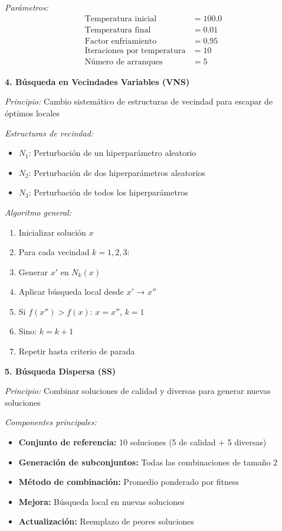 \textit{Parámetros:}
\begin{align}
\text{Temperatura inicial} &= 100.0 \\
\text{Temperatura final} &= 0.01 \\
\text{Factor enfriamiento} &= 0.95 \\
\text{Iteraciones por temperatura} &= 10 \\
\text{Número de arranques} &= 5
\end{align}

\textbf{4. Búsqueda en Vecindades Variables (VNS)}

\textit{Principio:} Cambio sistemático de estructuras de vecindad para escapar de óptimos locales

\textit{Estructuras de vecindad:}
\begin{itemize}
    \item $N_1$: Perturbación de un hiperparámetro aleatorio
    \item $N_2$: Perturbación de dos hiperparámetros aleatorios
    \item $N_3$: Perturbación de todos los hiperparámetros
\end{itemize}

\textit{Algoritmo general:}
\begin{enumerate}
    \item Inicializar solución $x$
    \item Para cada vecindad $k = 1, 2, 3$:
    \item \quad Generar $x'$ en $N_k(x)$
    \item \quad Aplicar búsqueda local desde $x'$ → $x''$
    \item \quad Si $f(x'') > f(x)$: $x = x''$, $k = 1$
    \item \quad Sino: $k = k + 1$
    \item Repetir hasta criterio de parada
\end{enumerate}

\textbf{5. Búsqueda Dispersa (SS)}

\textit{Principio:} Combinar soluciones de calidad y diversas para generar nuevas soluciones

\textit{Componentes principales:}
\begin{itemize}
    \item \textbf{Conjunto de referencia:} 10 soluciones (5 de calidad + 5 diversas)
    \item \textbf{Generación de subconjuntos:} Todas las combinaciones de tamaño 2
    \item \textbf{Método de combinación:} Promedio ponderado por fitness
    \item \textbf{Mejora:} Búsqueda local en nuevas soluciones
    \item \textbf{Actualización:} Reemplazo de peores soluciones
\end{itemize}

